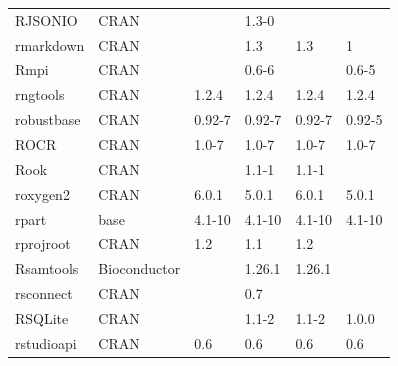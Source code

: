 \begin{longtable}{llllll}
\rowcolor{black!5}
RJSONIO                       & CRAN                      &             & 1.3-0       &                &                    \\
\rowcolor{black!10}
rmarkdown                     & CRAN                      &             & 1.3         & 1.3            & 1                 \\
\rowcolor{black!5}
Rmpi                          & CRAN                      &             & 0.6-6       &                & 0.6-5              \\
\rowcolor{black!10}
rngtools                      & CRAN                      & 1.2.4       & 1.2.4       & 1.2.4          & 1.2.4             \\
\rowcolor{black!5}
robustbase                    & CRAN                      & 0.92-7      & 0.92-7      & 0.92-7         & 0.92-5             \\
\rowcolor{black!10}
ROCR                          & CRAN                      & 1.0-7       & 1.0-7       & 1.0-7          & 1.0-7             \\
\rowcolor{black!5}
Rook                          & CRAN                      &             & 1.1-1       & 1.1-1          &                    \\
\rowcolor{black!10}
roxygen2                      & CRAN                      & 6.0.1       & 5.0.1       & 6.0.1          & 5.0.1             \\
\rowcolor{black!5}
rpart                         & base                      & 4.1-10      & 4.1-10      & 4.1-10         & 4.1-10             \\
\rowcolor{black!10}
rprojroot                     & CRAN                      & 1.2         & 1.1         & 1.2            &                   \\
\rowcolor{black!5}
Rsamtools                     & Bioconductor              &             & 1.26.1      & 1.26.1         &                    \\
\rowcolor{black!10}
rsconnect                     & CRAN                      &             & 0.7         &                &                   \\
\rowcolor{black!5}
RSQLite                       & CRAN                      &             & 1.1-2       & 1.1-2          & 1.0.0              \\
\rowcolor{black!10}
rstudioapi                    & CRAN                      & 0.6         & 0.6         & 0.6            & 0.6               \\

\end{longtable}

